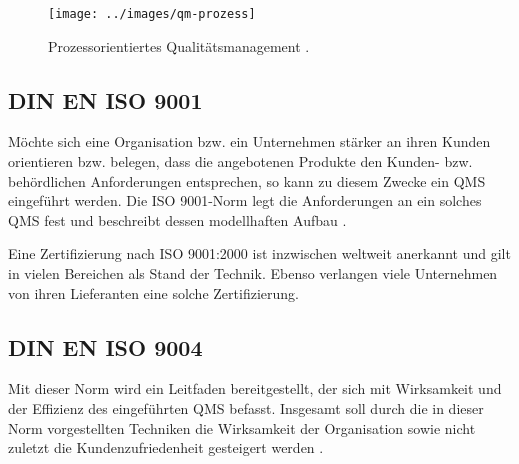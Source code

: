 \begin{figure} 
  \centering
  \texttt{[image: ../images/qm-prozess]}
  \caption{Prozessorientiertes Qualitätsmanagement \citep[S.~10]{din9000}.}
  \label{fig:qm-prozess}
\end{figure}

\subsection{DIN EN ISO 9001} \label{subsec:din9001}
Möchte sich eine Organisation bzw. ein Unternehmen stärker an ihren Kunden
orientieren bzw. belegen, dass die angebotenen Produkte den Kunden- bzw.
behördlichen Anforderungen entsprechen, so kann zu diesem Zwecke ein QMS
eingeführt werden. Die ISO 9001-Norm legt die Anforderungen an ein solches QMS
fest und beschreibt dessen modellhaften Aufbau \citep{din9001}.

Eine Zertifizierung nach ISO 9001:2000 ist inzwischen weltweit anerkannt und 
gilt in vielen Bereichen als Stand der Technik. Ebenso verlangen viele 
Unternehmen von ihren Lieferanten eine solche Zertifizierung.

\subsection{DIN EN ISO 9004}
Mit dieser Norm wird ein Leitfaden bereitgestellt, der sich mit Wirksamkeit und 
der Effizienz des eingeführten QMS befasst. Insgesamt soll durch die in dieser 
Norm vorgestellten Techniken die Wirksamkeit der Organisation sowie nicht 
zuletzt die Kundenzufriedenheit gesteigert werden \citep{din9004}.